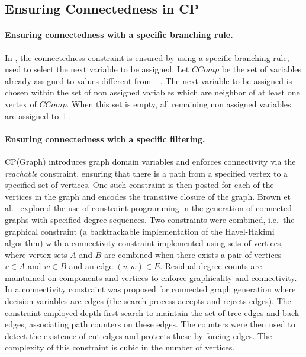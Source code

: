 \documentclass{llncs}
\begin{document}
\subsection{Ensuring Connectedness in CP}\label{mccs-cp}

\paragraph{Ensuring connectedness with a specific branching rule.} In
\cite{DBLP:conf/mco/VismaraV08}, the connectedness constraint is ensured by using a specific
branching rule, used to select the next variable to be assigned. Let $CComp$ be the set of variables
already assigned to values different from $\bot$. The next variable to be assigned is chosen within
the set of non assigned variables which are neighbor of at least one vertex of $CComp$. When this
set is empty, all remaining non assigned variables are assigned to $\bot$.

\paragraph{Ensuring connectedness with a specific filtering.}

CP(Graph) \cite{DBLP:conf/cp/DoomsDD05} introduces graph domain variables and enforces connectivity via the
\emph{reachable} constraint, ensuring that there is a path from a specified vertex to a specified
set of vertices. One such constraint is then posted for each of the vertices in the graph and
encodes the transitive closure of the graph. Brown et al.\ \cite{Brown:2005} explored the use of
constraint programming in the generation of connected graphs with specified degree sequences.  Two
constraints were combined, i.e.\ the graphical constraint (a backtrackable implementation of the
Havel-Hakimi algorithm) with a connectivity constraint implemented using sets of vertices, where
vertex sets $A$ and $B$ are combined when there exists a pair of vertices $v \in A$ and $w \in B$
and an edge $(v,w) \in E$. Residual degree counts are maintained on components and vertices to
enforce graphicality and connectivity. In \cite{DBLP:conf/ecai/ProsserU06} a connectivity constraint was proposed for
connected graph generation where decision variables are edges (the search process accepts and
rejects edges). The constraint employed depth first search to maintain the set of tree edges and
back edges, associating path counters on these edges. The counters were then used to detect the
existence of cut-edges and protects these by forcing edges. The complexity of this constraint is
cubic in the number of vertices.
\end{document}
